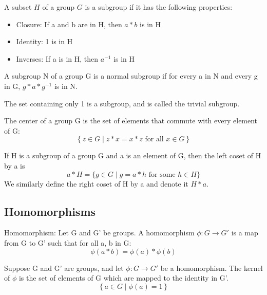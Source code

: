 \documentclass[runningheads,a4paper]{llncs}
\renewcommand{\-}{\setminus}
\begin{document}
\begin{definition}[Subgroup]
A subset $H$ of a group $G$ is a subgroup if it has the following properties:
\begin{itemize}
\item Closure: If a and b are in H, then $a * b$ is in H
\item Identity: 1 is in H
\item Inverses: If a is in H, then $a^{-1}$ is in H
\end{itemize}
\end{definition}

\begin{definition}[Normal]
A subgroup N of a group G is a normal subgroup if for every a in N and every g in G, $g * a * g^{-1}$ is in N.
\end{definition}

\begin{definition} The set containing only 1 is a subgroup, and is called the trivial subgroup.
\end{definition}

\begin{definition}[Center]
The center of a group G is the set of elements that commute with every element of G:
\[
\left\{ z \in G \mid z*x = x*z \text{ for all } x \in G \right\}
\]
\end{definition}

\begin{definition}
If H is a subgroup of a group G and a is an element of G, then the left coset of H by a is 
\[
a * H = \{ g \in G \mid g = a * h \text{ for some } h \in H \}
\]
We similarly define the right coset of H by a and denote it $H * a$.
\end{definition}

\subsection{Homomorphisms}

\begin{definition}[Homomorphism]
Homomorphism: Let G and G' be groups. A homomorphism $\phi : G \to G'$ is a map from G to G' such that for all a, b in G:
\[
\phi (a * b) = \phi(a) * \phi(b)
\]
\end{definition}

\begin{definition}[Kernel]
Suppose G and G' are groups, and let $\phi : G \to G'$ be a homomorphism. The kernel of $\phi$ is the set of elements of G which are mapped to the identity in G'.
\[
\left\{ a \in G \mid \phi(a) = 1 \right\}
\]
\end{definition}
\end{document}
